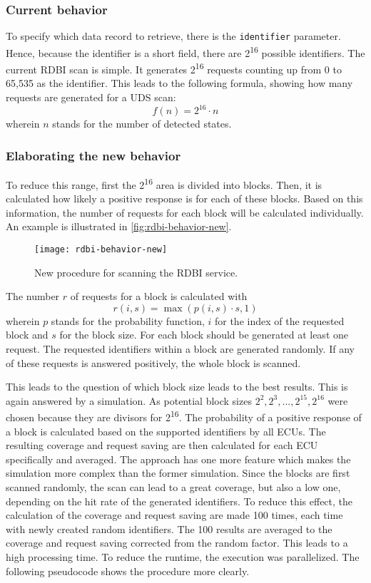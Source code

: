 \subsubsection{Current behavior}

To specify which data record to retrieve, there is the \texttt{identifier} parameter. Hence, because the identifier is a short field, there are 2\textsuperscript{16} possible identifiers.
The current RDBI scan is simple. It generates 2\textsuperscript{16} requests counting up from 0 to 65,535 as the identifier. This leads to the following formula, showing how many requests are generated for a UDS scan:
\[f(n)=2^{16} \cdot n\]
wherein $n$ stands for the number of detected states. 

\subsubsection{Elaborating the new behavior}

To reduce this range, first the 2\textsuperscript{16} area is divided into blocks. Then, it is calculated how likely a positive response is for each of these blocks. Based on this information, the number of requests for each block will be calculated individually. An example is illustrated in \autoref{fig:rdbi-behavior-new}.

\begin{figure}[h]
    \centering
    \texttt{[image: rdbi-behavior-new]}
    \caption{New procedure for scanning the RDBI service.}
    \label{fig:rdbi-behavior-new}
\end{figure}

The number $r$ of requests for a block is calculated with
\[r(i, s)=\max(p(i, s) \cdot s, 1)\]
wherein $p$ stands for the probability function, $i$ for the index of the requested block and $s$ for the block size. For each block should be generated at least one request. The requested identifiers within a block are generated randomly. If any of these requests is answered positively, the whole block is scanned.

This leads to the question of which block size leads to the best results. This is again answered by a simulation. As potential block sizes $2^2, 2^3, ..., 2^{15}, 2^{16}$ were chosen because they are divisors for 2\textsuperscript{16}. The probability of a positive response of a block is calculated based on the supported identifiers by all ECUs. The resulting coverage and request saving are then calculated for each ECU specifically and averaged. The approach has one more feature which makes the simulation more complex than the former simulation. Since the blocks are first scanned randomly, the scan can lead to a great coverage, but also a low one, depending on the hit rate of the generated identifiers. To reduce this effect, the calculation of the coverage and request saving are made 100 times, each time with newly created random identifiers. The 100 results are averaged to the coverage and request saving corrected from the random factor. This leads to a high processing time. To reduce the runtime, the execution was parallelized.
The following pseudocode shows the procedure more clearly.

